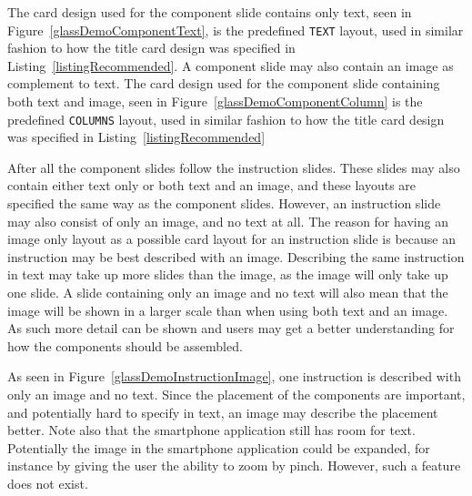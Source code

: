 The card design used for the component slide contains only text, seen in Figure~\ref{glassDemoComponentText}, is the predefined \texttt{TEXT} layout, used in similar fashion to how the title card design was specified in Listing~\ref{listingRecommended}. A component slide may also contain an image as complement to text. The card design used for the component slide containing both text and image, seen in Figure~\ref{glassDemoComponentColumn} is the predefined \texttt{COLUMNS} layout, used in similar fashion to how the title card design was specified in Listing~\ref{listingRecommended}

After all the component slides follow the instruction slides. These slides may also contain either text only or both text and an image, and these layouts are specified the same way as the component slides. However, an instruction slide may also consist of only an image, and no text at all. The reason for having an image only layout as a possible card layout for an instruction slide is because an instruction may be best described with an image. Describing the same instruction in text may take up more slides than the image, as the image will only take up one slide. A slide containing only an image and no text will also mean that the image will be shown in a larger scale than when using both text and an image. As such more detail can be shown and users may get a better understanding for how the components should be assembled.

As seen in Figure~\ref{glassDemoInstructionImage}, one instruction is described with only an image and no text. Since the placement of the components are important, and potentially hard to specify in text, an image may describe the placement better. Note also that the smartphone application still has room for text. Potentially the image in the smartphone application could be expanded, for instance by giving the user the ability to zoom by pinch. However, such a feature does not exist.

